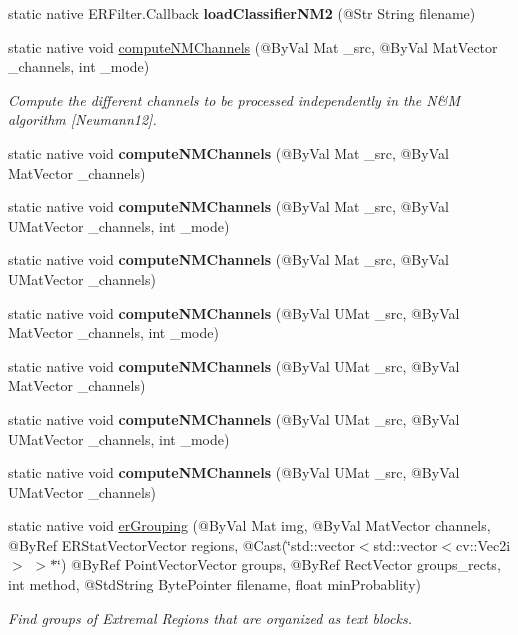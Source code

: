 \begin{DoxyCompactItemize}
static native E\+R\+Filter.\+Callback {\bfseries load\+Classifier\+N\+M2} (@Str String filename)
\item 
static native void \hyperlink{group__text__detect_ga67163615b824817020e39c2738a0b122}{compute\+N\+M\+Channels} (@By\+Val Mat \+\_\+src, @By\+Val Mat\+Vector \+\_\+channels, int \+\_\+mode)
\begin{DoxyCompactList}\small\item\em Compute the different channels to be processed independently in the N\&M algorithm \mbox{[}Neumann12\mbox{]}. \end{DoxyCompactList}\item 
static native void {\bfseries compute\+N\+M\+Channels} (@By\+Val Mat \+\_\+src, @By\+Val Mat\+Vector \+\_\+channels)
\item 
static native void {\bfseries compute\+N\+M\+Channels} (@By\+Val Mat \+\_\+src, @By\+Val U\+Mat\+Vector \+\_\+channels, int \+\_\+mode)
\item 
static native void {\bfseries compute\+N\+M\+Channels} (@By\+Val Mat \+\_\+src, @By\+Val U\+Mat\+Vector \+\_\+channels)
\item 
static native void {\bfseries compute\+N\+M\+Channels} (@By\+Val U\+Mat \+\_\+src, @By\+Val Mat\+Vector \+\_\+channels, int \+\_\+mode)
\item 
static native void {\bfseries compute\+N\+M\+Channels} (@By\+Val U\+Mat \+\_\+src, @By\+Val Mat\+Vector \+\_\+channels)
\item 
static native void {\bfseries compute\+N\+M\+Channels} (@By\+Val U\+Mat \+\_\+src, @By\+Val U\+Mat\+Vector \+\_\+channels, int \+\_\+mode)
\item 
static native void {\bfseries compute\+N\+M\+Channels} (@By\+Val U\+Mat \+\_\+src, @By\+Val U\+Mat\+Vector \+\_\+channels)
\item 
static native void \hyperlink{group__text__detect_ga3198c558c08dac61bce863d430bf2da6}{er\+Grouping} (@By\+Val Mat img, @By\+Val Mat\+Vector channels, @By\+Ref E\+R\+Stat\+Vector\+Vector regions, @Cast(\char`\"{}std\+::vector$<$std\+::vector$<$cv\+::\+Vec2i$>$ $>$$\ast$\char`\"{}) @By\+Ref Point\+Vector\+Vector groups, @By\+Ref Rect\+Vector groups\+\_\+rects, int method, @Std\+String Byte\+Pointer filename, float min\+Probablity)
\begin{DoxyCompactList}\small\item\em Find groups of Extremal Regions that are organized as text blocks. \end{DoxyCompactList}\item 
$$
\end{DoxyCompactItemize}
